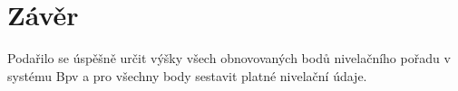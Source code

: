 \section{Závěr}

Podařilo se úspěšně určit výšky všech obnovovaných bodů nivelačního pořadu v systému Bpv a pro všechny body sestavit platné nivelační údaje.